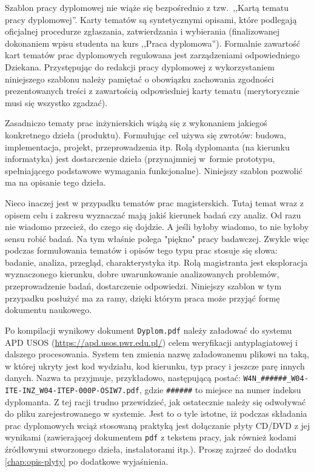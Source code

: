 Szablon pracy dyplomowej nie wiąże się bezpośrednio z tzw.\ ,,Kartą tematu pracy dyplomowej''. Karty tematów są syntetycznymi opisami, które podlegają oficjalnej procedurze zgłaszania, zatwierdzania i wybierania (finalizowanej dokonaniem wpisu studenta na kurs ,,Praca dyplomowa''). Formalnie zawartość kart tematów prac dyplomowych regulowana jest zarządzeniami odpowiedniego Dziekana. Przystępując do redakcji pracy dyplomowej z wykorzystaniem niniejszego szablonu należy pamiętać o obowiązku zachowania zgodności prezentowanych treści z zawartością odpowiedniej karty tematu (merytorycznie musi się wszystko zgadzać).

Zasadniczo tematy prac inżynierskich wiążą się z wykonaniem jakiegoś konkretnego dzieła (produktu). Formułując cel używa się zwrotów:
budowa, implementacja, projekt, przeprowadzenia itp. Rolą dyplomanta (na kierunku informatyka) jest dostarczenie dzieła (przynajmniej w~formie prototypu, spełniającego podstawowe wymagania funkcjonalne). Niniejszy szablon pozwolić ma na opisanie tego dzieła.

Nieco inaczej jest w przypadku tematów prac magisterskich. Tutaj temat wraz z opisem celu i zakresu wyznaczać mają jakiś kierunek badań czy analiz. Od razu nie wiadomo przecież, do czego się dojdzie. A jeśli byłoby wiadomo, to nie byłoby sensu robić badań.  Na tym właśnie polega "piękno" pracy badawczej. 
Zwykle więc podczas formułowania tematów i opisów tego typu prac stosuje się słowa: badanie, analiza, przegląd, charakterystyka itp. Rolą magistranta jest eksploracja wyznaczonego kierunku, dobre uwarunkowanie analizowanych problemów, przeprowadzenie badań, dostarczenie odpowiedzi. Niniejszy szablon w tym przypadku posłużyć ma za ramy, dzięki którym praca może przyjąć formę dokumentu naukowego.

Po kompilacji wynikowy dokument \texttt{Dyplom.pdf} należy załadować do systemu APD USOS (\url{https://apd.usos.pwr.edu.pl/}) celem weryfikacji antyplagiatowej i dalszego procesowania. System ten zmienia nazwę załadowanemu plikowi na taką, w której ukryty jest kod wydziału, kod kierunku, typ pracy i jeszcze parę innych danych. Nazwa ta przyjmuje, przykładowo, następującą postać: \texttt{W4N\_\#\#\#\#\#\#\_W04-ITE-INZ\_W04-ITEP-000P-OSIW7.pdf}, gdzie \texttt{\#\#\#\#\#\#} to miejsce na numer indeksu dyplomanta. Z tej racji trudno przewidzieć, jak ostatecznie należy się odwoływać do pliku zarejestrowanego w systemie. Jest to o tyle istotne, iż podczas składania prac dyplomowych wciąż stosowaną praktyką jest dołączanie płyty CD/DVD z jej wynikami (zawierającej dokumentem \texttt{pdf} z tekstem pracy, jak również kodami źródłowymi stworzonego dzieła, instalatorami itp.). Proszę zajrzeć do dodatku \ref{chap:opis-plyty} po dodatkowe wyjaśnienia.

